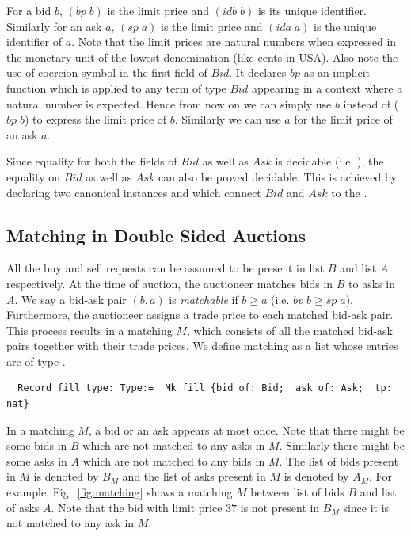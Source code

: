 \documentclass[a4paper,UKenglish,cleveref, autoref]{lipics-v2019}
\begin{document}
For a bid $b$, $(bp \; b)$  is the limit price and $(idb \; b)$ is its unique identifier. Similarly for an ask $a$, $(sp \; a)$ is the limit price and $(ida \; a)$ is the unique identifier of $a$. Note that the limit prices are natural numbers when expressed in the monetary unit of the lowest denomination (like cents in USA). Also note the use of coercion symbol \tw{ :>} in the first field of $Bid$. It declares $bp$ as an implicit function which is applied to any term of type $Bid$ appearing in a context where a natural number is expected. Hence from now on we can simply use $b$ instead of ($bp \;b$) to express the limit price of $b$. Similarly we can use $a$ for the limit price of an ask $a$.


Since equality for both the fields of $Bid$ as well as $Ask$ is decidable (i.e. ), the equality on $Bid$ as well as $Ask$ can also be proved decidable. This is achieved by declaring two canonical instances  and  which connect $Bid$ and $Ask$ to the .  

\subsection{Matching in Double Sided Auctions}
All the buy and sell requests can be assumed to be present in list $B$ and list $A$ respectively. At the time of auction, the auctioneer matches bids in $B$ to asks in $A$. We say a bid-ask pair $(b, a)$ is \emph{matchable} if $b \ge a$ (i.e. $bp \; b \ge sp \; a$).  Furthermore, the auctioneer assigns a trade price to each matched bid-ask pair. This  process results in  a matching $M$, which consists of all the matched bid-ask pairs together with their trade prices. We define matching as a list whose entries are of type .
\begin{verbatim}
  Record fill_type: Type:=  Mk_fill {bid_of: Bid;  ask_of: Ask;  tp: nat} 
\end{verbatim}

In a matching $M$, a bid or an ask appears at most once. Note that there might be some bids in $B$ which are not matched to any asks in $M$. Similarly there might be some asks in $A$ which are not matched to any bids in $M$. The list of bids present in $M$ is denoted by $B_{M}$ and the list of asks present in $M$ is denoted by $A_M$. For example, Fig.~\ref{fig:matching} shows a matching $M$ between list of bids $B$ and list of asks $A$. Note that the bid with limit price $37$ is not present in $B_M$ since it is not matched to any ask in $M$.  
\end{document}

